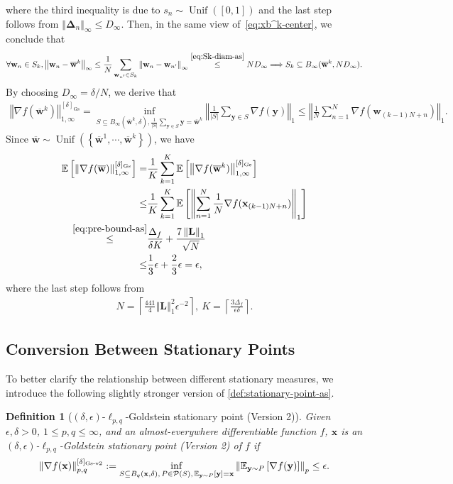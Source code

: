 \documentclass{article}
\newtheorem{defn}{Definition}
\def \y {\mathbf{y}}
\def \E {\mathbb{E}}
\def \x {\mathbf{x}}
\def \w {\mathbf{w}}
\def \P {\mathcal{P}}
\def \Lb {\mathbf{L}}
\def \wb {\overline{\w}}
\DeclareMathOperator*{\unif}{Unif}
\newcommand{\norm}[1]{\left\Vert#1\right\Vert}
\newcommand{\abs}[1]{\left|#1\right|}
\def \bDelta {\bm{\Delta}}
\newcommand{\sqbrac}[1]{\left[#1\right]}
\newcommand{\brac}[1]{\left(#1\right)}
\newcommand{\cbrac}[1]{\left\{#1\right\}}
\def\ceil#1{\left\lceil #1 \right\rceil}
\begin{document}
where the third inequality is due to $s_n\sim\unif([0,1])$ and the last step follows from $\norm{\bDelta_n}_\infty\le D_\infty$. Then, in the same view of~\eqref{eq:xb^k-center}, we conclude that
\begin{align*}
    \forall\w_n\in S_k,\norm{\w_n-\wb^k}_\infty\le\frac{1}{N}\sum_{\w_{n^\prime}\in S_k}\norm{\w_n-\w_{n^\prime}}_\infty\overset{\eqref{eq:Sk-diam-as}}{\le}ND_\infty\Longrightarrow S_k\subseteq B_\infty(\wb^k,ND_\infty).
\end{align*}
By choosing $D_\infty=\delta/N$, we derive that
\begin{align*}
        \norm{\nabla f(\wb^k)}_{1,\infty}^{[\delta]_{\textrm{Gs}}}=\inf_{S\subseteq B_\infty(\wb^k,\delta),\frac{1}{\abs{S}}\sum_{\y\in S}\y=\wb^k}\norm{\frac{1}{\abs{S}}\sum_{\y\in S}\nabla f(\y)}_1\le\norm{\frac{1}{N}\sum_{n=1}^N\nabla f(\w_{(k-1)N+n})}_1.
\end{align*}
Since $\wb\sim\unif\brac{\cbrac{\wb^1,\cdots,\wb^k}}$, we have
\begin{align*}
    \E\sqbrac{\norm{\nabla f(\wb)}_{1,\infty}^{[\delta]_{\textrm{Gs}}}}=&\frac{1}{K}\sum_{k=1}^K\E\sqbrac{\norm{\nabla f(\wb^k)}_{1,\infty}^{[\delta]_{\textrm{Gs}}}}\\\le&\frac{1}{K}\sum_{k=1}^K\E\sqbrac{\norm{\sum_{n=1}^N\frac{1}{N}\nabla f(\x_{(k-1)N+n})}_1}\\\overset{\eqref{eq:pre-bound-as}}{\le}&\frac{\Delta_f}{\delta K}+\frac{7\norm{\Lb}_1}{\sqrt{N}}\\\le& \frac{1}{3}\epsilon+\frac{2}{3}\epsilon=\epsilon,
\end{align*}
where the last step follows from
\begin{align*}
    N=\ceil{\frac{441}{4}\norm{\Lb}_1^2\epsilon^{-2}},\ K=\ceil{\frac{3\Delta_f}{\epsilon\delta}}.
\end{align*}

\subsection{Conversion Between Stationary Points\label{sec:stationary-points}}

To better clarify the relationship between different stationary measures, we introduce the following slightly stronger version of \cref{def:stationary-point-as}.

\begin{defn}[$(\delta,\epsilon)$-$\ell_{p,q}$-Goldstein stationary point (Version 2)]\label{def:stationary-point-as-v2}
Given $\epsilon,\delta>0$, $1\le p,q\le\infty$, and an almost-everywhere differentiable function $f$, $\x$ is an $(\delta,\epsilon)$-$\ell_{p,q}$-Goldstein stationary point (Version 2) of $f$ if
\begin{align*}
    \norm{\nabla f(\x)}_{p,q}^{[\delta]_{\textnormal{Gs-v2}}}
    :=
    \inf_{S\subseteq B_q(\x,\delta),\,P\in\P(S),\,\E_{\y\sim P}\sqbrac{\y}=\x}
    \norm{\E_{\y\sim P}\sqbrac{\nabla f(\y)}}_p
    \le \epsilon.
\end{align*}
\end{defn}
\end{document}

